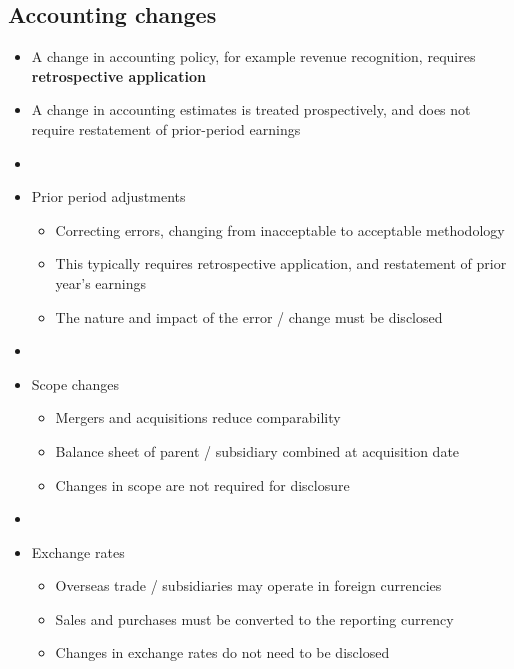 \documentclass[../notes_compiled.tex]{subfiles}
\begin{document}
\subsection{Accounting changes}
\begin{itemize}
\item A change in accounting policy, for example revenue recognition, requires \textbf{retrospective application}
\item A change in accounting estimates is treated prospectively, and does not require restatement of prior-period earnings
\item[]
\item Prior period adjustments
\begin{itemize}
\item Correcting errors, changing from inacceptable to acceptable methodology
\item This typically requires retrospective application, and restatement of prior year's earnings
\item The nature and impact of the error / change must be disclosed
\end{itemize}
\item[]
\item Scope changes
\begin{itemize}
\item Mergers and acquisitions reduce comparability
\item Balance sheet of parent / subsidiary combined at acquisition date
\item Changes in scope are not required for disclosure
\end{itemize}
\item[]
\item Exchange rates
\begin{itemize}
\item Overseas trade / subsidiaries may operate in foreign currencies
\item Sales and purchases must be converted to the reporting currency
\item Changes in exchange rates do not need to be disclosed
\end{itemize}
\end{itemize}
\end{document}
